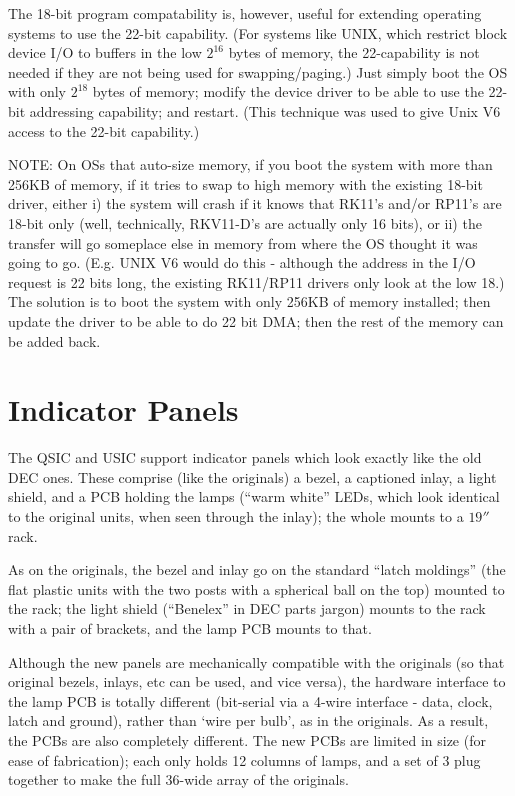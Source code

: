 The 18-bit program compatability is, however, useful for extending operating
systems to use the 22-bit capability. (For systems like UNIX, which restrict
block device I/O to buffers in the low $2^{16}$ bytes of memory, the
22-capability is not needed if they are not being used for swapping/paging.)
Just simply boot the OS with only $2^{18}$ bytes of memory; modify the device
driver to be able to use the 22-bit addressing capability; and restart. (This
technique was used to give Unix V6 access to the 22-bit capability.)

NOTE: On OSs that auto-size memory, if you boot the system with more than
256KB of memory, if it tries to swap to high memory with the existing 18-bit
driver, either i) the system will crash if it knows that RK11's and/or RP11's
are 18-bit only (well, technically, RKV11-D's are actually only 16 bits), or
ii) the transfer will go someplace else in memory from where the OS thought
it was going to go. (E.g. UNIX V6 would do this - although the address in the
I/O request is 22 bits long, the existing RK11/RP11 drivers only look at the
low 18.) The solution is to boot the system with only 256KB of memory
installed; then update the driver to be able to do 22 bit DMA; then the rest
of the memory can be added back.

\chapter{Indicator Panels}

The QSIC and USIC support indicator panels which look exactly like the old
DEC ones. These comprise (like the originals) a bezel, a captioned inlay, a
light shield, and a PCB holding the lamps (``warm white'' LEDs, which look
identical to the original units, when seen through the inlay); the whole
mounts to a $19''$ rack.

As on the originals, the bezel and inlay go on the standard ``latch moldings''
(the flat plastic units with the two posts with a spherical ball on the top)
mounted to the rack; the light shield (``Benelex'' in DEC parts jargon) mounts
to the rack with a pair of brackets, and the lamp PCB mounts to that.

Although the new panels are mechanically compatible with the originals (so
that original bezels, inlays, etc can be used, and vice versa), the hardware
interface to the lamp PCB is totally different (bit-serial via a 4-wire
interface - data, clock, latch and ground), rather than `wire per bulb', as
in the originals. As a result, the PCBs are also completely different. The
new PCBs are limited in size (for ease of fabrication); each only holds 12
columns of lamps, and a set of 3 plug together to make the full 36-wide array
of the originals.

